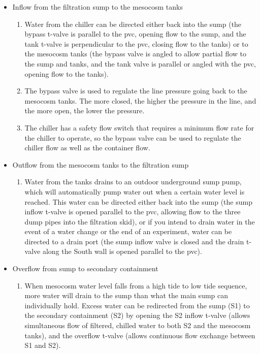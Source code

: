 \documentclass[]{book}
\providecommand{\tightlist}{%
  \setlength{\itemsep}{0pt}\setlength{\parskip}{0pt}}
\begin{document}
\begin{itemize}
\tightlist
\item
  Inflow from the filtration sump to the mesocosm tanks

  \begin{enumerate}
  \def\labelenumi{\arabic{enumi}.}
  \tightlist
  \item
    Water from the chiller can be directed either back into the sump
    (the bypass t-valve is parallel to the pvc, opening flow to the
    sump, and the tank t-valve is perpendicular to the pvc, closing flow
    to the tanks) or to the mesocosm tanks (the bypass valve is angled
    to allow partial flow to the sump and tanks, and the tank valve is
    parallel or angled with the pvc, opening flow to the tanks).
  \item
    The bypass valve is used to regulate the line pressure going back to
    the mesocosm tanks. The more closed, the higher the pressure in the
    line, and the more open, the lower the pressure.
  \item
    The chiller has a safety flow switch that requires a minimum flow
    rate for the chiller to operate, so the bypass valve can be used to
    regulate the chiller flow as well as the container flow.
  \end{enumerate}
\item
  Outflow from the mesocosm tanks to the filtration sump

  \begin{enumerate}
  \def\labelenumi{\arabic{enumi}.}
  \tightlist
  \item
    Water from the tanks drains to an outdoor underground sump pump,
    which will automatically pump water out when a certain water level
    is reached. This water can be directed either back into the sump
    (the sump inflow t-valve is opened parallel to the pvc, allowing
    flow to the three dump pipes into the filtration skid), or if you
    intend to drain water in the event of a water change or the end of
    an experiment, water can be directed to a drain port (the sump
    inflow valve is closed and the drain t-valve along the South wall is
    opened parallel to the pvc).
  \end{enumerate}
\item
  Overflow from sump to secondary containment

  \begin{enumerate}
  \def\labelenumi{\arabic{enumi}.}
  \tightlist
  \item
    When mesocosm water level falls from a high tide to low tide
    sequence, more water will drain to the sump than what the main sump
    can individually hold. Excess water can be redirected from the sump
    (S1) to the secondary containment (S2) by opening the S2 inflow
    t-valve (allows simultaneous flow of filtered, chilled water to both
    S2 and the mesocosm tanks), and the overflow t-valve (allows
    continuous flow exchange between S1 and S2).
  \end{enumerate}
\end{itemize}
\end{document}

